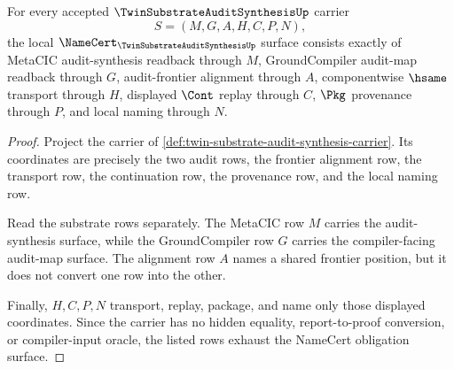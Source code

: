 \begin{theorem}
\label{thm:twin-substrate-audit-synthesis-namecert-obligations}
For every accepted $\TwinSubstrateAuditSynthesisUp$ carrier
$$
S=(M,G,A,H,C,P,N),
$$
the local $\NameCert_{\TwinSubstrateAuditSynthesisUp}$ surface consists exactly of MetaCIC audit-synthesis readback through $M$, GroundCompiler audit-map readback through $G$, audit-frontier alignment through $A$, componentwise $\hsame$ transport through $H$, displayed $\Cont$ replay through $C$, $\Pkg$ provenance through $P$, and local naming through $N$.
\end{theorem}
\begin{proof}
Project the carrier of \autoref{def:twin-substrate-audit-synthesis-carrier}. Its coordinates are precisely the two audit rows, the frontier alignment row, the transport row, the continuation row, the provenance row, and the local naming row.

Read the substrate rows separately. The MetaCIC row $M$ carries the audit-synthesis surface, while the GroundCompiler row $G$ carries the compiler-facing audit-map surface. The alignment row $A$ names a shared frontier position, but it does not convert one row into the other.

Finally, $H,C,P,N$ transport, replay, package, and name only those displayed coordinates. Since the carrier has no hidden equality, report-to-proof conversion, or compiler-input oracle, the listed rows exhaust the NameCert obligation surface.
\end{proof}

